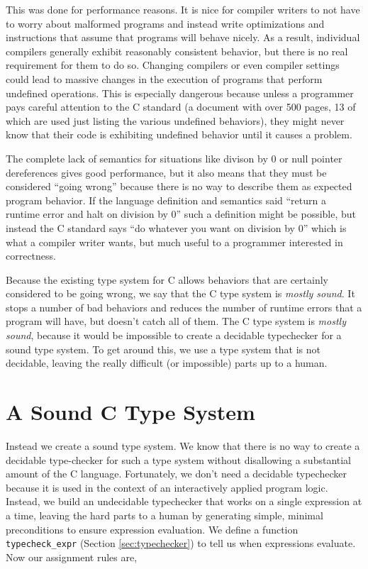 \documentclass{puthesis}
\begin{document}
This was done for performance reasons. It is nice for compiler writers
to not have to worry about malformed programs and instead write
optimizations and instructions that assume that programs will behave
nicely.  As a result, individual compilers generally exhibit
reasonably consistent behavior, but there is no real requirement for
them to do so. Changing compilers or even compiler settings could lead
to massive changes in the execution of programs that perform undefined
operations. This is especially dangerous because unless a programmer
pays careful attention to the C standard (a document with over 500
pages, 13 of which are used just listing the various undefined
behaviors), they might never know that their code is exhibiting
undefined behavior until it causes a problem.

The complete lack of semantics for situations like divison by 0 or
null pointer dereferences gives good performance, but it also means
that they must be considered ``going wrong'' because there is no way
to describe them as expected program behavior. If the language
definition and semantics said ``return a runtime error and halt on
division by 0'' such a definition might be possible, but instead the C
standard says ``do whatever you want on division by 0'' which is what
a compiler writer wants, but much useful to a programmer interested in
correctness.

Because the existing type system for C allows behaviors that are
certainly considered to be going wrong, we say that the C type system
is \emph{mostly sound}. It stops a number of bad behaviors and reduces
the number of runtime errors that a program will have, but doesn't
catch all of them. The C type system is \emph{mostly sound}, because
it would be impossible to create a decidable typechecker for a sound
type system. To get around this, we use a type system that is not
decidable, leaving the really difficult (or impossible) parts up to a
human.


\section{A Sound C Type System}

Instead we create a sound type system. We know that there is no way to
create a decidable type-checker for such a type system without
disallowing a substantial amount of the C language. Fortunately, we
don't need a decidable typechecker because it is used in the context
of an interactively applied program logic.  Instead, we build an
undecidable typechecker that works on a single expression at a time,
leaving the hard parts to a human by generating simple, minimal
preconditions to ensure expression evaluation. We define a function
\lstinline|typecheck_expr| (Section \ref{sec:typechecker}) to tell us
when expressions evaluate.  Now our assignment rules are,
\end{document}
